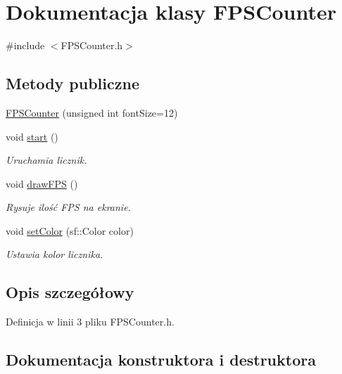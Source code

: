 \hypertarget{class_f_p_s_counter}{}\section{Dokumentacja klasy F\+P\+S\+Counter}
\label{class_f_p_s_counter}


{\ttfamily \#include $<$F\+P\+S\+Counter.\+h$>$}

\subsection*{Metody publiczne}
\begin{DoxyCompactItemize}
\item 
\mbox{\hyperlink{class_f_p_s_counter_ae565c465bd222c4f733813b402d232a8}{F\+P\+S\+Counter}} (unsigned int font\+Size=12)
\item 
void \mbox{\hyperlink{class_f_p_s_counter_abba94df2064bfa561ef9d1a3e11929a5}{start}} ()
\begin{DoxyCompactList}\small\item\em Uruchamia licznik. \end{DoxyCompactList}\item 
void \mbox{\hyperlink{class_f_p_s_counter_a7415ae4bb4094b4809627caf5e40d8f1}{draw\+F\+PS}} ()
\begin{DoxyCompactList}\small\item\em Rysuje ilość F\+PS na ekranie. \end{DoxyCompactList}\item 
void \mbox{\hyperlink{class_f_p_s_counter_a57be5e95f140cb230f3f4e11ca476857}{set\+Color}} (sf\+::\+Color color)
\begin{DoxyCompactList}\small\item\em Ustawia kolor licznika. \end{DoxyCompactList}\end{DoxyCompactItemize}


\subsection{Opis szczegółowy}


Definicja w linii 3 pliku F\+P\+S\+Counter.\+h.



\subsection{Dokumentacja konstruktora i destruktora}
\mbox{\label{class_f_p_s_counter_ae565c465bd222c4f733813b402d232a8}} 
